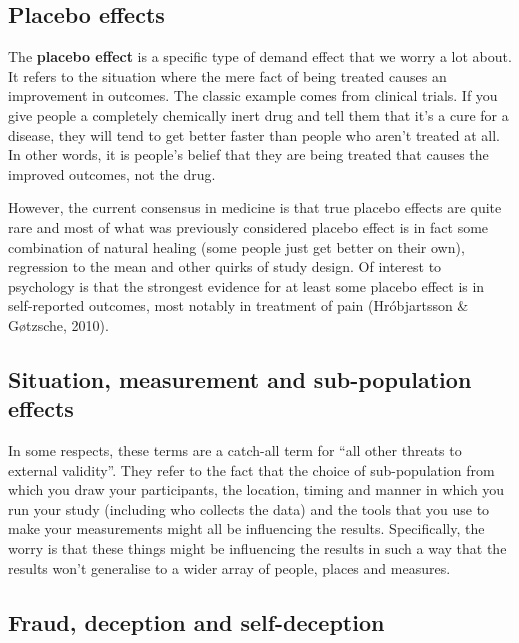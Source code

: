 \documentclass[
  letterpaper,
]{book}
\begin{document}
\hypertarget{placebo-effects}{%
\subsection{Placebo effects}\label{placebo-effects}}

The \textbf{placebo effect} is a specific type of demand effect that we
worry a lot about. It refers to the situation where the mere fact of
being treated causes an improvement in outcomes. The classic example
comes from clinical trials. If you give people a completely chemically
inert drug and tell them that it's a cure for a disease, they will tend
to get better faster than people who aren't treated at all. In other
words, it is people's belief that they are being treated that causes the
improved outcomes, not the drug.

However, the current consensus in medicine is that true placebo effects
are quite rare and most of what was previously considered placebo effect
is in fact some combination of natural healing (some people just get
better on their own), regression to the mean and other quirks of study
design. Of interest to psychology is that the strongest evidence for at
least some placebo effect is in self-reported outcomes, most notably in
treatment of pain (Hróbjartsson \& Gøtzsche, 2010).

\hypertarget{situation-measurement-and-sub-population-effects}{%
\subsection{Situation, measurement and sub-population
effects}\label{situation-measurement-and-sub-population-effects}}

In some respects, these terms are a catch-all term for ``all other
threats to external validity''. They refer to the fact that the choice
of sub-population from which you draw your participants, the location,
timing and manner in which you run your study (including who collects
the data) and the tools that you use to make your measurements might all
be influencing the results. Specifically, the worry is that these things
might be influencing the results in such a way that the results won't
generalise to a wider array of people, places and measures.

\hypertarget{fraud-deception-and-self-deception}{%
\subsection{Fraud, deception and
self-deception}\label{fraud-deception-and-self-deception}}
\end{document}
